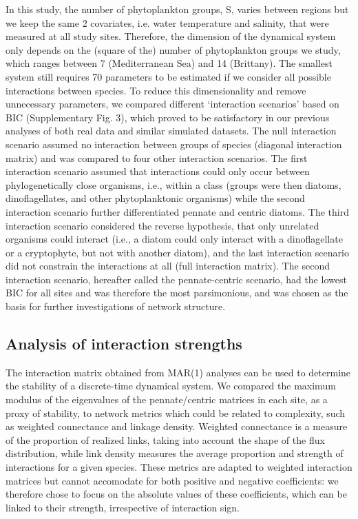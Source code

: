\documentclass[9pt,twocolumn,twoside,lineno]{pnas-new}
\begin{document}
{In this study, the number of phytoplankton groups, S, varies between
regions but we keep the same 2 covariates, i.e. water temperature
and salinity, that were measured at all study sites. Therefore, the
dimension of the dynamical system only depends on the (square of the)
number of phytoplankton groups we study, which ranges between 7 (Mediterranean
Sea) and 14 (Brittany). The smallest system still requires 70 parameters
to be estimated if we consider all possible interactions between species.
To reduce this dimensionality and remove unnecessary parameters, we
compared different `interaction scenarios' based on BIC (Supplementary
Fig. 3), which proved to be satisfactory in our previous analyses
of both real data and similar simulated datasets\cite{barraquand_coastal_2018}.
The null interaction scenario assumed no interaction between groups
of species (diagonal interaction matrix) and was compared to four
other interaction scenarios. The first interaction scenario assumed
that interactions could only occur between phylogenetically close
organisms, i.e., within a class (groups were then diatoms, dinoflagellates,
and other phytoplanktonic organisms) while the second interaction
scenario further differentiated pennate and centric diatoms. The third
interaction scenario considered the reverse hypothesis, that only
unrelated organisms could interact (i.e., a diatom could only interact
with a dinoflagellate or a cryptophyte, but not with another diatom),
and the last interaction scenario did not constrain the interactions
at all (full interaction matrix). The second interaction scenario,
hereafter called the pennate-centric scenario, had the lowest BIC
for all sites and was therefore the most parsimonious, and was chosen
as the basis for further investigations of network structure.

\subsection*{Analysis of interaction strengths}

The interaction matrix obtained from MAR(1) analyses can be used to
determine the stability of a discrete-time dynamical system\cite{ives_estimating_2003}.
We compared the maximum modulus of the eigenvalues of the pennate/centric
matrices in each site, as a proxy of stability, to network metrics
which could be related to complexity, such as weighted connectance
and linkage density\cite{breier_emergence_2018}. Weighted connectance
is a measure of the proportion of realized links, taking into account
the shape of the flux distribution, while link density measures the
average proportion and strength of interactions for a given species.
These metrics are adapted to weighted interaction matrices but cannot
accomodate for both positive and negative coefficients: we therefore
chose to focus on the absolute values of these coefficients, which
can be linked to their strength, irrespective of interaction sign.

}
\end{document}
